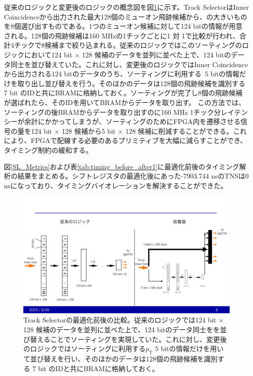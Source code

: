 従来のロジックと変更後のロジックの概念図を図\ref{TrackSele_ba}に示す。Track SelectorはInner Coincidenceから出力された最大128個のミューオン飛跡候補から、\pt の大きいものを8個選び出すものである。1つのミューオン候補に対して124 bitの情報が用意される。128個の飛跡候補は160 MHzの1チックごとに1 対 1で\pt 比較が行われ、合計4チックで8候補まで絞り込まれる。従来のロジックではこのソーティングのロジックにおいて124 bit $\times$ 128 候補のデータを並列に並べた上で、124 bitのデータ同士を並び替えていた。これに対し、変更後のロジックではInner Coincidenceから出力される124 bitのデータのうち、ソーティングに利用する\pt$\,$ 5 bitの情報だけを取り出し並び替えを行う。そのほかのデータは128個の飛跡候補を識別する 7 bit のIDと共にBRAMに格納しておく。ソーティングが完了し8個の飛跡候補が選ばれたら、そのIDを用いてBRAMからデータを取り出す。
この方法では、ソーティングの後BRAMからデータを取り出すのに160 MHz 1チック分レイテンシーが余計にかかってしまうが、ソーティングのためにFPGA内を遷移させる信号の量を124 bit $\times$ 128 候補から5 bit $\times$ 128 候補に削減することができる。これにより、FPGAで配線する必要のあるプリミティブを大幅に減らすことができ、タイミング制約の緩和する。

図\ref{SL_Metrics}および表\ref{tab:timing_before_after1}に最適化前後のタイミング解析の結果をまとめる。シフトレジスタの最適化後にあった-7903.744 nsのTNSは0 nsになっており、タイミングバイオレーションを解決することができた。

\begin{figure} 
\centering
\includegraphics[width=16cm]{fig/SL/TrackSele_ba.pdf}
\caption[Track Selectorの最適化前後の比較]{Track Selectorの最適化前後の比較。従来のロジックでは124 bit $\times$ 128 候補のデータを並列に並べた上で、124 bitのデータ同士をを並び替えることでソーティングを実現していた。これに対し、変更後のロジックではソーティングに利用する$p_\mathrm{T}$ 5 bitの情報だけを用いて並び替えを行い、そのほかのデータは128個の飛跡候補を識別する 7 bit のIDと共にBRAMに格納しておく。}
\label{TrackSele_ba}
\end{figure}


